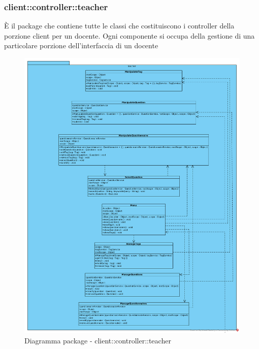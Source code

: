 \subsubsection{client::controller::teacher}
È il package che contiene tutte le classi che costituiscono i controller della porzione client per un docente. Ogni componente si occupa della gestione di una particolare porzione dell'interfaccia di un docente\begin{center}
		\begin{figure}[H]
			\centering \includegraphics[scale=4, max width=\textwidth, max height=\myheight]{../img/diagrammiClassi/client/controller/teacher.png}
			\caption{Diagramma package - client::controller::teacher}
		\end{figure}
	\end{center}\hypertarget{client::controller::teacher::ManipulateTag}{}
